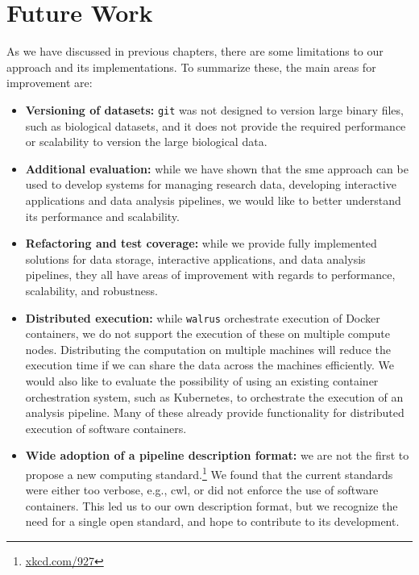 
\section{Future Work}
As we have discussed in previous chapters, there are some limitations to our
approach and its implementations. To summarize these, the main areas for
improvement are: 

\begin{itemize} 

\item \textbf{Versioning of datasets:} \texttt{git} was not designed to version
large binary files, such as biological datasets, and it does not provide the
required performance or scalability to version the large biological data. 

\item \textbf{Additional evaluation:} while we have shown that the \gls{sme}
approach can be used to develop systems for managing research data, developing
interactive applications and data analysis pipelines, we would like to
better understand its performance and scalability. 

\item \textbf{Refactoring and test coverage:} while we provide fully implemented
solutions for data storage, interactive applications, and data analysis
pipelines, they all have areas of improvement with regards to performance,
scalability, and robustness. 

\item \textbf{Distributed execution:} while \texttt{walrus} orchestrate
execution of Docker containers, we do not support the execution of these on
multiple compute nodes. Distributing the computation on multiple machines will
reduce the execution time if we can share the data across the
machines efficiently. We would also like to evaluate the possibility of using an
existing container orchestration system, such as
Kubernetes, to orchestrate the execution of an analysis pipeline. Many of these
already provide functionality for distributed execution of software containers. 

\item \textbf{Wide adoption of a pipeline description format:} we are not the
first to propose a new computing standard.\footnote{\url{xkcd.com/927}} We found
that the current standards were either too verbose, e.g., \gls{cwl}, or did not
enforce the use of software containers. This led us to our own description
format, but we recognize the need for a single open standard, and hope to
contribute to its development. 

\end{itemize} 

